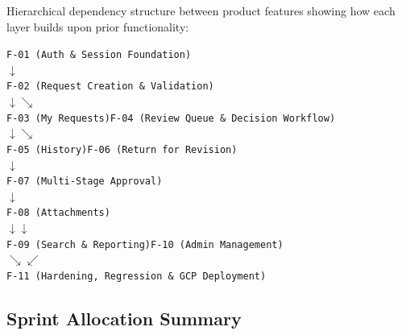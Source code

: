 \documentclass[11pt,a4paper]{article}
\begin{document}
Hierarchical dependency structure between product features showing how each layer builds upon prior functionality:\\

\begin{tcolorbox}[colback=codebg,colframe=lightbg,arc=1mm,boxrule=0.5pt]\small
\texttt{F-01 (Auth \& Session Foundation)}\\
\hspace*{1.5em}$\downarrow$\\
\texttt{F-02 (Request Creation \& Validation)}\\
\hspace*{1.5em}$\downarrow$\hspace*{4.5em}$\searrow$\\
\texttt{F-03 (My Requests)}\hspace*{1.5em}\texttt{F-04 (Review Queue \& Decision Workflow)}\\
\hspace*{12.5em}$\downarrow$\hspace*{4.5em}$\searrow$\\
\hspace*{9.5em}\texttt{F-05 (History)}\hspace*{1.5em}\texttt{F-06 (Return for Revision)}\\
\hspace*{18.5em}$\downarrow$\\
\hspace*{15.5em}\texttt{F-07 (Multi-Stage Approval)}\\
\hspace*{18.5em}$\downarrow$\\
\hspace*{15.5em}\texttt{F-08 (Attachments)}\\
\hspace*{1.5em}$\downarrow$\hspace*{10.5em}$\downarrow$\\
\texttt{F-09 (Search \& Reporting)}\hspace*{1.5em}\texttt{F-10 (Admin Management)}\\
\hspace*{7.5em}$\searrow$\hspace*{3.5em}$\swarrow$\\
\hspace*{4.5em}\texttt{F-11 (Hardening, Regression \& GCP Deployment)}
\end{tcolorbox}


\subsection{Sprint Allocation Summary}
\end{document}
